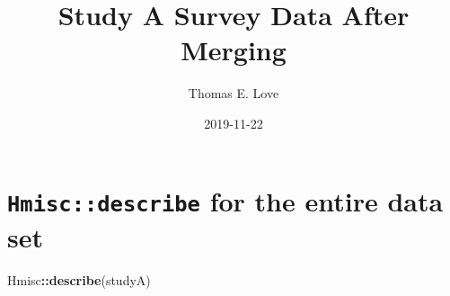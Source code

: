\documentclass[]{article}
\title{Study A Survey Data After Merging}
\author{Thomas E. Love}
\date{2019-11-22}
\newenvironment{Shaded}{\begin{snugshade}}{\end{snugshade}}
\newcommand{\KeywordTok}[1]{\textcolor[rgb]{0.13,0.29,0.53}{\textbf{#1}}}
\newcommand{\NormalTok}[1]{#1}
\newcommand{\OperatorTok}[1]{\textcolor[rgb]{0.81,0.36,0.00}{\textbf{#1}}}
\begin{document}
\maketitle

\hypertarget{hmiscdescribe-for-the-entire-data-set}{%
\section{\texorpdfstring{\texttt{Hmisc::describe} for the entire data
set}{Hmisc::describe for the entire data set}}\label{hmiscdescribe-for-the-entire-data-set}}

\begin{Shaded}
\begin{Highlighting}[]
\NormalTok{Hmisc}\OperatorTok{::}\KeywordTok{describe}\NormalTok{(studyA)}
\end{Highlighting}
\end{Shaded}
\end{document}
